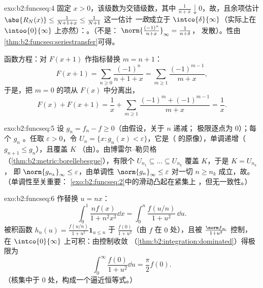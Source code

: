 \begin{solution}{exo:b2:funcseq:4}
固定 $x > 0$，该级数为交错级数，其中 $\frac{1}{n + x}
\downarrow 0$，故，且余项估计
$\abs{R_N(x)} \leq \frac{1}{N + 1 + x} \leq \frac{1}{N+1}$ 这一估计
\emph{一致}成立于 $\intco{\delta}{\infty}$（实际上在
$\intoo{0}{\infty}$ 上亦然）：。（不是：
$\norm{\frac{(-1)^n}{n+x}}_\infty = \frac{1}{n + \delta}$，
发散）。性由
\cref{thm:b2:funcseq:seriestransfer}可得。

函数方程：对 $F(x + 1)$ 作指标替换 $m = n + 1$：
\[
F(x+1) = \sum_{n\geq0} \frac{(-1)^n}{n + 1 + x}
= \sum_{m\geq1}\frac{(-1)^{m-1}}{m+x} ,
\]
于是，把 $m = 0$ 的项从 $F(x)$ 中分离出，
\[
F(x) + F(x+1)
= \frac{1}{x} + \sum_{m\geq1}
\frac{(-1)^m + (-1)^{m-1}}{m+x} = \frac1x .
\]
\end{solution}

\begin{solution}{exo:b2:funcseq:5}
设 $g_n = f_n - f \geq 0$（由假设，关于 $n$ 递减；
极限逐点为 $0$）；每个 $g_n$ 。任取 $\varepsilon
> 0$，令 $U_n = \{x : g_n(x) < \varepsilon\}$，它是（
的原像），单调递增（$g_{n+1} \leq g_n$），且覆盖 $K$
（由）。由博雷尔--勒贝格
（\cref{thm:b2:metric:borellebesgue}），有限个 $U_{n_1}
\subseteq \dots \subseteq U_{n_k}$ 覆盖 $K$，于是 $K = U_{n_k}$，
即 $\norm{g_{n_k}}_\infty \leq \varepsilon$，由单调性
$\norm{g_n}_\infty \leq \varepsilon$ 对一切 $n \geq n_k$ 成立，故。（单调性至关重要：
\cref{exo:b2:funcseq:2}中的滑动凸起在紧集上
，但无一致性。）
\end{solution}

\begin{solution}{exo:b2:funcseq:6}
作替换 $u = nx$：
\[
\int_0^1 \frac{n f(x)}{1 + n^2x^2}\dd x
= \int_0^n \frac{f(u/n)}{1 + u^2}\,\dd u .
\]
被积函数 $h_n(u) = \frac{f(u/n)}{1+u^2}\mathbf{1}_{u \leq n}$
于 $\frac{f(0)}{1+u^2}$（由 $f$ 在
$0$ 处），且被 $\frac{\norm f_\infty}{1 + u^2}$ 控制，
在 $\intco{0}{\infty}$ 上可积：由控制收敛
（\cref{thm:b2:integration:dominated}）得极限为
\[
\int_0^\infty \frac{f(0)}{1 + u^2}\dd u = \frac{\pi}{2} f(0) .
\]
（核集中于 $0$ 处，构成一个逼近恒等式。）
\end{solution}

